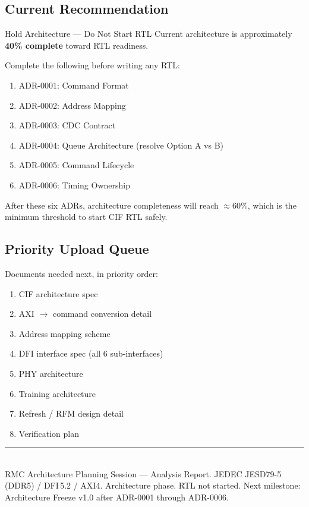 \documentclass[10pt,a4paper]{article}
\begin{document}
\subsection{Current Recommendation}

\begin{okbox}{Hold Architecture --- Do Not Start RTL}
Current architecture is approximately \textbf{40\% complete} toward RTL readiness.

Complete the following before writing any RTL:
\begin{enumerate}
  \item ADR-0001: Command Format
  \item ADR-0002: Address Mapping
  \item ADR-0003: CDC Contract
  \item ADR-0004: Queue Architecture (resolve Option A vs B)
  \item ADR-0005: Command Lifecycle
  \item ADR-0006: Timing Ownership
\end{enumerate}
After these six ADRs, architecture completeness will reach $\approx$60\%,
which is the minimum threshold to start CIF RTL safely.
\end{okbox}

\subsection{Priority Upload Queue}

Documents needed next, in priority order:

\begin{enumerate}
  \item CIF architecture spec
  \item AXI $\to$ command conversion detail
  \item Address mapping scheme
  \item DFI interface spec (all 6 sub-interfaces)
  \item PHY architecture
  \item Training architecture
  \item Refresh / RFM design detail
  \item Verification plan
\end{enumerate}

\vspace{10pt}
\noindent\color{acc1!40}\rule{\linewidth}{0.5pt}\\[2pt]
{\small\color{notetext}
RMC Architecture Planning Session --- Analysis Report.
JEDEC JESD79-5 (DDR5) / DFI\,5.2 / AXI4.
Architecture phase. RTL not started.
Next milestone: Architecture Freeze v1.0 after ADR-0001 through ADR-0006.}
\end{document}
